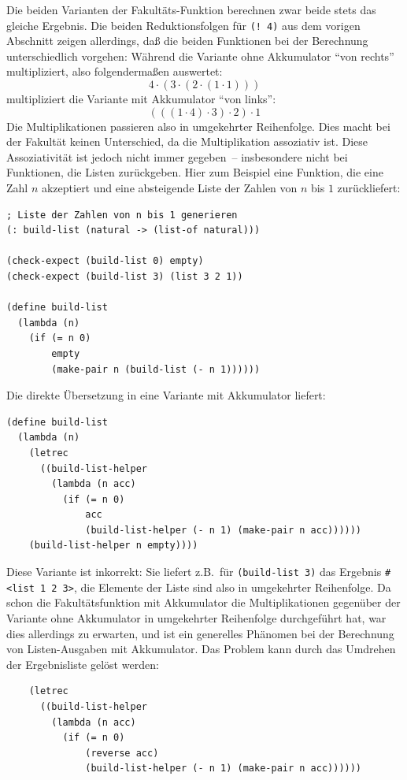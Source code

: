 Die beiden Varianten der Fakultäts-Funktion berechnen zwar beide 
stets das gleiche Ergebnis.  Die beiden Reduktionsfolgen für
\texttt{(! 4)} aus dem vorigen Abschnitt zeigen allerdings, daß die
beiden Funktionen bei der Berechnung unterschiedlich vorgehen:
Während die Variante ohne Akkumulator "`von rechts"' multipliziert,
also folgendermaßen auswertet:
%
\begin{displaymath}
  4\cdot (3 \cdot (2 \cdot (1 \cdot 1)))
\end{displaymath}
%
multipliziert die Variante mit Akkumulator "`von links"':
%
\begin{displaymath}
  (((1 \cdot 4)\cdot 3)\cdot 2)\cdot 1
\end{displaymath}
%
Die Multiplikationen passieren also in umgekehrter Reihenfolge.
Dies macht bei der Fakultät keinen Unterschied, da die Multiplikation
assoziativ ist.  Diese Assoziativität ist jedoch nicht immer
gegeben~-- insbesondere nicht bei Funktionen, die Listen zurückgeben.
Hier zum Beispiel eine Funktion, die eine Zahl $n$ akzeptiert und eine
absteigende Liste der Zahlen von $n$ bis $1$ zurückliefert:
%
\begin{verbatim}
; Liste der Zahlen von n bis 1 generieren
(: build-list (natural -> (list-of natural)))

(check-expect (build-list 0) empty)
(check-expect (build-list 3) (list 3 2 1))

(define build-list
  (lambda (n)
    (if (= n 0)
        empty
        (make-pair n (build-list (- n 1))))))
\end{verbatim}
%
Die direkte Übersetzung in eine Variante mit Akkumulator liefert:
%
\begin{verbatim}
(define build-list
  (lambda (n)
    (letrec
      ((build-list-helper
        (lambda (n acc)
          (if (= n 0)
              acc
              (build-list-helper (- n 1) (make-pair n acc))))))
    (build-list-helper n empty))))
\end{verbatim}
%
Diese Variante ist inkorrekt: Sie liefert z.B.\ für
\texttt{(build-list 3)} das Ergebnis \verb|#<list 1 2 3>|, die
Elemente der Liste sind also in umgekehrter Reihenfolge.  Da schon die
Fakultätsfunktion mit Akkumulator die Multiplikationen gegenüber der
Variante ohne Akkumulator in umgekehrter Reihenfolge durchgeführt hat, war dies allerdings zu
erwarten, und ist ein generelles Phänomen bei der Berechnung von
Listen-Ausgaben mit Akkumulator.  Das Problem kann durch das Umdrehen
der Ergebnisliste gelöst werden:
%
\begin{verbatim}
    (letrec
      ((build-list-helper
        (lambda (n acc)
          (if (= n 0)
              (reverse acc)
              (build-list-helper (- n 1) (make-pair n acc))))))
\end{verbatim}
%


